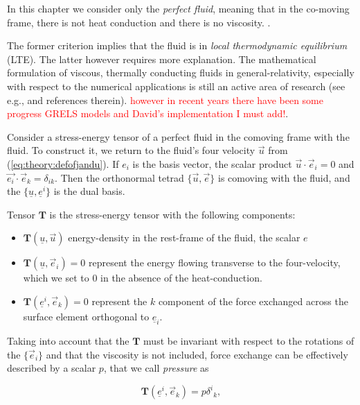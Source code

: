 In this  chapter we consider only the \textit{perfect fluid}, meaning that in the co-moving frame, there is not heat conduction and there is no viscosity. 
. 

The former criterion implies that the fluid is in \textit{local thermodynamic equilibrium} (LTE). 
The latter however requires more explanation. 
The mathematical formulation of viscous, thermally conducting fluids in general-relativity, especially with respect to the numerical applications is still an active area of research  (see e.g., \cite{Andersson:2006nr} and references therein). 
\textcolor{red}{however in recent years there have been some progress GRELS models and David's implementation I must add!}.

Consider a stress-energy tensor of a perfect fluid in the comoving frame with the fluid. 
To construct it, we return to the fluid's four velocity $\vec{u}$ from (\ref{eq:theory:defofjandu}). 
If $e_{i}$ is the basis vector, the scalar product $\vec{u}\cdot\vec{e}_i=0$ and $\vec{e_i}\cdot\vec{e}_k = \delta_{ik}$. 
Then the orthonormal tetrad $\{\vec{u},\vec{e}\}$ is comoving with the fluid, and the $\{\underline{u},\underline{e}^i\}$ is the dual basis. 

Tensor $\boldsymbol{T}$ is the stress-energy tensor with the following components: 

\begin{itemize}
    \item $\boldsymbol{T}(\underline{u}, \vec{u})$ energy-density in the rest-frame of the fluid, the scalar $e$
    \item $\boldsymbol{T}(\underline{u}, \vec{e}_i) = 0$ represent the energy flowing transverse to the four-velocity, which we set to $0$ in the absence of the heat-conduction.
    \item $\boldsymbol{T}(\underline{e}^i, \vec{e}_k) = 0$ represent the $k$ component of the force exchanged across the surface element orthogonal to $\underline{e}_i$.
\end{itemize}

Taking into account that the $\boldsymbol{T}$ must be invariant with respect to the rotations of the $\{\vec{e}_i\}$ and that the viscosity is not included, force exchange can be effectively described by a scalar $p$, that we call \textit{pressure} as

\begin{equation}
\boldsymbol{T}(\underline{e}^i,\vec{e}_k) = p {\delta^i}_k,
\end{equation}

